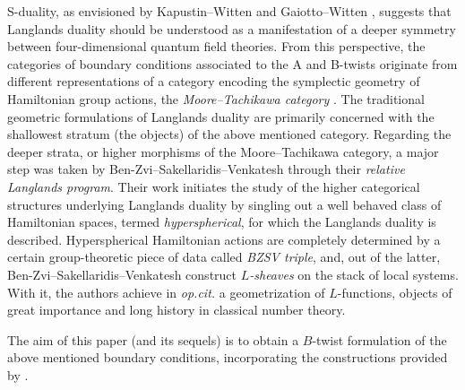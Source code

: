 \documentclass[11pt, a4paper]{amsart}
\numberwithin{equation}{section}
\theoremstyle{definition}
\theoremstyle{remark}
\begin{document}
S-duality, as envisioned by Kapustin--Witten \cite{kapustin&witten} and Gaiotto--Witten \cite{gaiotto&witten}, suggests that Langlands duality should be understood as a manifestation of a deeper symmetry between four-dimensional quantum field theories. From this perspective, the categories of boundary conditions associated to the A and B-twists originate from different representations of a category encoding the symplectic geometry of Hamiltonian group actions, the {\it Moore--Tachikawa category} \cite{Moore--Tachikawa}. The traditional geometric formulations of Langlands duality are primarily concerned with the shallowest stratum (the objects) of the above mentioned category. Regarding the deeper strata, or higher morphisms of the Moore--Tachikawa category, a major step was taken by Ben-Zvi--Sakellaridis--Venkatesh \cite{BZSV} through their \textit{relative Langlands program}. Their work initiates the study of the higher categorical structures underlying Langlands duality by singling out a well behaved class of Hamiltonian spaces, termed \emph{hyperspherical}, for which the Langlands duality is described. Hyperspherical Hamiltonian actions are completely determined by a certain group-theoretic piece of data called {\it BZSV triple}, and, out of the latter, Ben-Zvi--Sakellaridis--Venkatesh construct \textit{$L$-sheaves} on the stack of local systems. With it, the authors achieve in {\it op.cit.} a geometrization of $L$-functions, objects of great importance and long history in classical number theory. %


The aim of this paper (and its sequels) is to obtain a $B$-twist formulation of the above mentioned boundary conditions, incorporating the constructions provided by \cite{BZSV}. 
\end{document}
